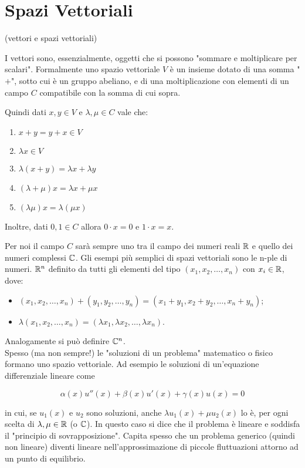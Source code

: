 \chapter{Spazi Vettoriali}

\begin{definition}{(vettori e spazi vettoriali)}

I vettori sono, essenzialmente, oggetti che si possono "sommare e moltiplicare per scalari". Formalmente uno spazio vettoriale $V$ è un insieme dotato di una somma "$+$", sotto cui è un gruppo abeliano, e di una moltiplicazione con elementi di un campo $C$ compatibile con la somma di cui sopra. 

\end{definition}

Quindi dati $x,y \in V$ e $\lambda, \mu \in C$ vale che:

\begin{enumerate}
\item $x+y = y+x \in V$
\item $\lambda x \in V$
\item $\lambda(x+y) = \lambda x + \lambda y$
\item $(\lambda + \mu)x = \lambda x + \mu x$
\item $(\lambda \mu)x = \lambda (\mu x)$
\end{enumerate} 

Inoltre, dati $0,1 \in C$ allora $0 \cdot x = 0$ e $1 \cdot x = x$.

Per noi il campo $C$ sarà sempre uno tra il campo dei numeri reali $\mathbb R$ e quello dei numeri complessi $\mathbb C$. Gli esempi più semplici di spazi vettoriali sono le n-ple di numeri. $\mathbb R^n$ definito da tutti gli elementi del tipo $(x_1, x_2, \ldots , x_n)$ con $x_i \in \mathbb R$, dove:

\begin{itemize}
\item $(x_1, x_2, \ldots , x_n) + (y_1, y_2, \ldots , y_n) = (x_1 + y_1, x_2 + y_2,\ldots, x_n + y_n)$;
\item $\lambda (x_1, x_2, \ldots , x_n) = (\lambda x_1,\lambda x_2, \ldots , \lambda x_n)$.
\end{itemize} 

Analogamente si può definire $\mathbb C^n$.\\

Spesso (ma non sempre!) le "soluzioni di un problema" matematico o fisico formano uno spazio vettoriale. Ad esempio le soluzioni di un'equazione differenziale lineare come

\begin{equation}
\alpha(x) u''(x) + \beta(x) u'(x) + \gamma(x) u(x) = 0
\end{equation}
 
in cui, se $u_1(x)$ e $u_2$ sono soluzioni, anche $\lambda u_1(x) + \mu u_2(x)$ lo è, per ogni scelta di $\lambda, \mu \in \mathbb R$ (o $\mathbb C$). In questo caso si dice che il problema è lineare e soddisfa il "principio di sovrapposizione". Capita spesso che un problema generico (quindi non lineare) diventi lineare nell'approssimazione di piccole fluttuazioni attorno ad un punto di equilibrio.